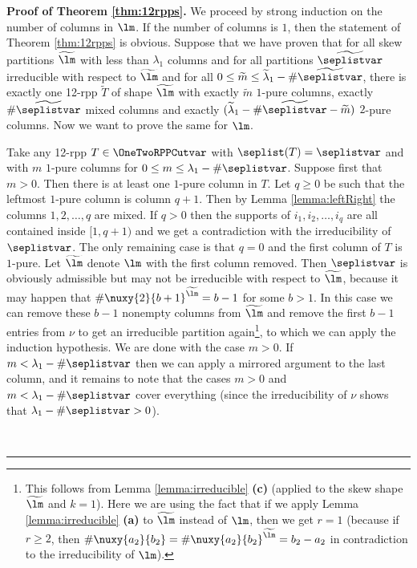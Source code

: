 \documentclass[numbers=enddot,12pt,final,onecolumn,notitlepage]{scrartcl}%
\theoremstyle{definition}
\newenvironment{proof}[1][Proof]{\noindent\textbf{#1.} }{\ \rule{0.5em}{0.5em}}
\begin{document}
\begin{proof}[Proof of Theorem \ref{thm:12rpps}]
We proceed by strong induction on the number of columns in $\lm$. If the number of columns is $1$, then the statement of Theorem \ref{thm:12rpps} is obvious. Suppose that we have proven that for all skew partitions $\widetilde{\lm}$ with less than $\lambda_1$ columns and for all partitions $\widetilde\seplistvar$  irreducible with respect to $\widetilde{\lm}$ and for all $0\leq \widetilde m\leq \widetilde{\lambda}_1-\#\widetilde\seplistvar$, there is exactly one 12-rpp $\widetilde T$ of shape $\widetilde{\lm}$ with exactly $\widetilde m$ $1$-pure columns, exactly $\#\widetilde\seplistvar$ mixed columns and exactly $(\widetilde{\lambda}_1-\#\widetilde\seplistvar-\widetilde m)$ $2$-pure columns. Now we want to prove the same for $\lm$.

Take any 12-rpp $T\in\OneTwoRPPCutvar$ with $\seplist(T)=\seplistvar$ and with $m$ $1$-pure columns for $0\leq m\leq \lambda_1-\#\seplistvar$. Suppose first that $m>0$. Then there is at least one $1$-pure column in $T$. Let $q\geq 0$ be such that the leftmost $1$-pure column is column $q+1$. Then by Lemma \ref{lemma:leftRight} the columns $1,2,\dots,q$ are mixed. If $q>0$ then the supports of $i_1,i_2,\dots,i_q$ are all contained inside $[1,q+1)$ and we get a contradiction with the irreducibility of $\seplistvar$. The only remaining case is that $q=0$ and the first column of $T$ is $1$-pure. Let $\widetilde\lm$ denote $\lm$ with the first column removed. Then $\seplistvar$ is obviously admissible but may not be irreducible with respect to $\widetilde{\lm}$, because it may happen that $\#\nuxy{2}{b+1}^{\widetilde{\lm}}=b-1$
for some $b>1$. In this case we can remove these $b-1$ nonempty columns from $\widetilde{\lm}$ and remove the first $b-1$ entries from $\nu$ to get an irreducible partition again\footnote{This follows from Lemma \ref{lemma:irreducible} \textbf{(c)} (applied to the skew shape $\widetilde{\lm}$ and $k=1$). Here we are using the fact that if we apply Lemma \ref{lemma:irreducible} \textbf{(a)} to $\widetilde{\lm}$ instead of $\lm$, then we get $r = 1$ (because if $r \geq 2$, then $\#\nuxy{a_2}{b_2} = \#\nuxy{a_2}{b_2}^{\widetilde{\lm}} = b_2-a_2$ in contradiction to the irreducibility of $\lm$).}, to which we can apply the induction hypothesis. We are done with the case $m>0$. If $m<\lambda_1-\#\seplistvar$ then we can apply a mirrored argument to the last column, and it remains to note that the cases $m>0$ and $m<\lambda_1-\#\seplistvar$ cover everything (since the irreducibility of $\nu$ shows that $\lambda_1-\#\seplistvar>0$).


\end{proof}
\end{document}
